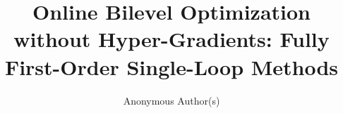 \documentclass{uai2026} %
\title{Online Bilevel Optimization without Hyper-Gradients: Fully First-Order Single-Loop Methods}
\author{Anonymous Author(s)}
\begin{document}
\onecolumn
\maketitle

%

%
\end{document}
